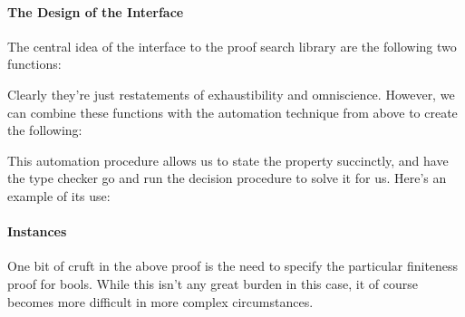 \paragraph{The Design of the Interface}
The central idea of the interface to the proof search library are the following
two functions:\\
\begin{minipage}{\linewidth}
  \begin{multicols}{2}
    \begin{agdalisting*}
    \end{agdalisting*} \columnbreak
    \begin{agdalisting*}
    \end{agdalisting*}
  \end{multicols}
\end{minipage}
Clearly they're just restatements of exhaustibility and omniscience.
However, we can combine these functions with the automation technique from above
to create the following:\\
\begin{minipage}{\linewidth}
  \begin{multicols}{2}
    \begin{agdalisting*}
    \end{agdalisting*} \columnbreak
    \begin{agdalisting*}
    \end{agdalisting*}
  \end{multicols}
\end{minipage}

This automation procedure allows us to state the property succinctly, and have
the type checker go and run the decision procedure to solve it for us.
Here's an example of its use:
\begin{agdalisting*}
\end{agdalisting*}

\paragraph{Instances}
One bit of cruft in the above proof is the need to specify the particular
finiteness proof for bools.
While this isn't any great burden in this case, it of course becomes more
difficult in more complex circumstances.

